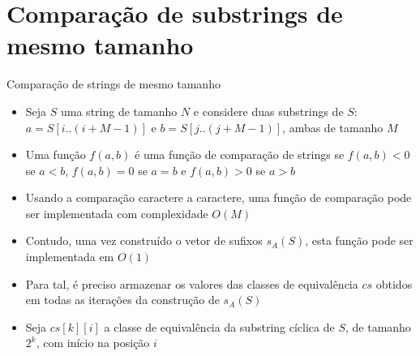 \section{Comparação de substrings de mesmo tamanho}

\begin{frame}[fragile]{Comparação de strings de mesmo tamanho}

    \begin{itemize}
        \item Seja $S$ uma string de tamanho $N$ e considere duas substrings de $S$: 
            $a = S[i..(i + M - 1)]$ e $b = S[j..(j + M - 1)]$, ambas de tamanho $M$

        \item Uma função $f(a, b)$ é uma função de comparação de strings se $f(a, b) < 0$ se
            $a < b$, $f(a, b) = 0$ se $a = b$ e $f(a, b) > 0$ se $a > b$

        \item Usando a comparação caractere a caractere, uma função de comparação pode ser 
            implementada com complexidade $O(M)$

        \item Contudo, uma vez construído o vetor de sufixos $s_A(S)$, esta função pode ser
            implementada em $O(1)$

        \item Para tal, é preciso armazenar os valores das classes de equivalência $cs$ obtidos
            em todas as iterações da construção de $s_A(S)$

        \item Seja $cs[k][i]$ a classe de equivalência da substring cíclica de $S$, de tamanho
            $2^k$, com início na posição $i$
    \end{itemize}

\end{frame}

